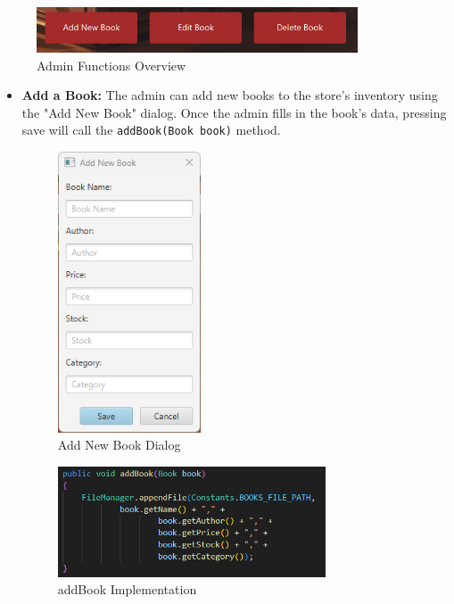 \documentclass[a4paper,14pt]{extarticle}
\begin{document}
\begin{figure}[H]
    \centering
    \includegraphics[width=0.85\textwidth]{Media/Admin Functions.png}
    \caption{Admin Functions Overview}
\end{figure}
\newpage
\begin{itemize}
    \item \textbf{Add a Book:} The admin can add new books to the store's inventory using the "Add New Book" dialog. Once the admin fills in the book's data, pressing save will call the 
    \texttt{add\-Book(Book book)} method.
    \begin{figure}[H]
        \centering
        \includegraphics[width=0.4\textwidth]{Media/Add New Book.png}
        \caption{Add New Book Dialog}
    \end{figure}
    \begin{figure}[H]
        \centering
        \includegraphics[width=0.75\textwidth]{Media/addBook.png}
        \caption{addBook Implementation}

\end{figure}
\end{itemize}
\end{document}
